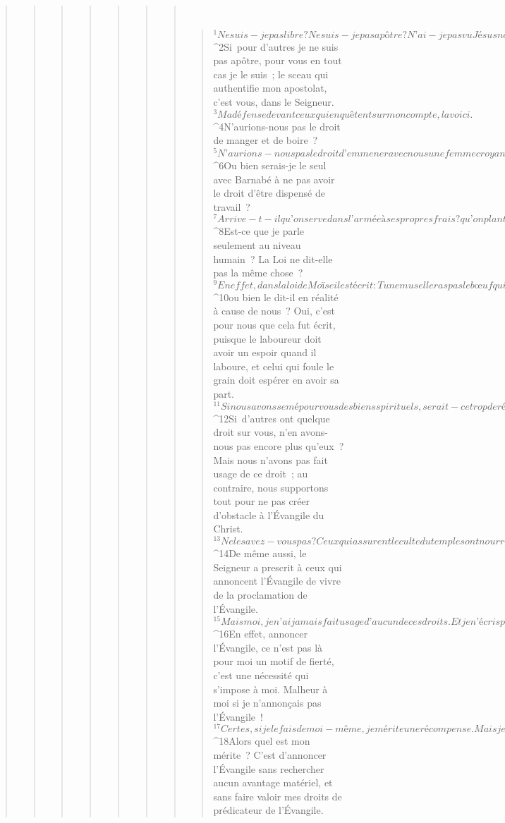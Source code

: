 \begin{verse}
\begin{verse}
\begin{verse}
\begin{verse}
\begin{verse}
\begin{verse}
\begin{verse}
         
      \bchapter{}
      \begin{verse}
${}^{1}Ne suis-je pas libre ? Ne suis-je pas apôtre ? N’ai-je pas vu Jésus notre Seigneur ? Et vous, n’êtes-vous pas mon œuvre dans le Seigneur ? 
${}^{2}Si pour d’autres je ne suis pas apôtre, pour vous en tout cas je le suis ; le sceau qui authentifie mon apostolat, c’est vous, dans le Seigneur. 
${}^{3}Ma défense devant ceux qui enquêtent sur mon compte, la voici. 
${}^{4}N’aurions-nous pas le droit de manger et de boire ? 
${}^{5}N’aurions-nous pas le droit d’emmener avec nous une femme croyante, comme les autres apôtres, les frères du Seigneur et Pierre ? 
${}^{6}Ou bien serais-je le seul avec Barnabé à ne pas avoir le droit d’être dispensé de travail ? 
${}^{7}Arrive-t-il qu’on serve dans l’armée à ses propres frais ? qu’on plante une vigne sans manger de ses fruits ? qu’on garde un troupeau sans boire du lait de ce troupeau ? 
${}^{8}Est-ce que je parle seulement au niveau humain ? La Loi ne dit-elle pas la même chose ? 
${}^{9}En effet, dans la loi de Moïse il est écrit : Tu ne muselleras pas le bœuf qui foule le grain. Dieu s’inquiète-t-il des bœufs ? 
${}^{10}ou bien le dit-il en réalité à cause de nous ? Oui, c’est pour nous que cela fut écrit, puisque le laboureur doit avoir un espoir quand il laboure, et celui qui foule le grain doit espérer en avoir sa part. 
${}^{11}Si nous avons semé pour vous des biens spirituels, serait-ce trop de récolter chez vous des biens matériels ? 
${}^{12}Si d’autres ont quelque droit sur vous, n’en avons-nous pas encore plus qu’eux ? Mais nous n’avons pas fait usage de ce droit ; au contraire, nous supportons tout pour ne pas créer d’obstacle à l’Évangile du Christ. 
${}^{13}Ne le savez-vous pas ? Ceux qui assurent le culte du temple sont nourris par le temple ; ceux qui servent à l’autel ont leur part de ce qui est offert sur l’autel. 
${}^{14}De même aussi, le Seigneur a prescrit à ceux qui annoncent l’Évangile de vivre de la proclamation de l’Évangile. 
${}^{15}Mais moi, je n’ai jamais fait usage d’aucun de ces droits. Et je n’écris pas cela pour les réclamer. Plutôt mourir ! Personne ne m’enlèvera ce motif de fierté. 
${}^{16}En effet, annoncer l’Évangile, ce n’est pas là pour moi un motif de fierté, c’est une nécessité qui s’impose à moi. Malheur à moi si je n’annonçais pas l’Évangile ! 
${}^{17}Certes, si je le fais de moi-même, je mérite une récompense. Mais je ne le fais pas de moi-même, c’est une mission qui m’est confiée. 
${}^{18}Alors quel est mon mérite ? C'est d'annoncer l'Évangile sans rechercher aucun avantage matériel, et sans faire valoir mes droits de prédicateur de l'Évangile.

\end{verse}
\end{verse}
\end{verse}
\end{verse}
\end{verse}
\end{verse}
\end{verse}
\end{verse}
